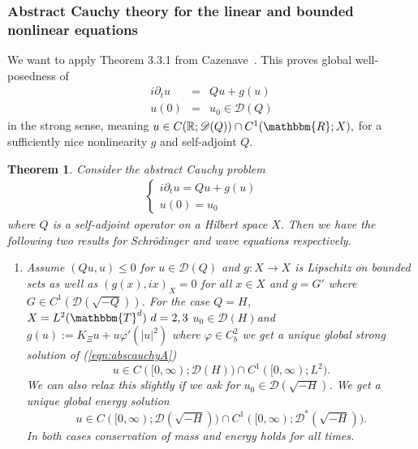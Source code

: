 \documentclass[11pt, oneside]{article}   	%
\newcommand{\assign}{:=}
\newenvironment{enumeratenumeric}{\begin{enumerate}[1.] }{\end{enumerate}}
\newtheorem{theorem}{Theorem}[section]
\begin{document}
		\subsubsection{Abstract Cauchy theory for the linear and bounded nonlinear
			equations}\label{sec:abslinear}
		We want to apply Theorem 3.3.1 from Cazenave~\cite{cazenave2003semilinear}. This proves global well-posedness of
		\begin{eqnarray*}
			i \partial_t u & = & Q u + g (u)\\
			u (0) & = & u_0 \in \mathscr{D} (Q)
		\end{eqnarray*}
		in the strong sense, meaning $u \in C (\mathbb{R}; \mathscr{D} (Q)) \cap C^1
		(\mathbbm{R}; X),$ for a sufficiently nice nonlinearity $g$ and self-adjoint
		$Q.$
		\begin{theorem}
			\label{thm:abscauchy}Consider the abstract Cauchy problem
			\begin{eqnarray}
			\left\{ \begin{array}{l}
			i \partial_t u = Q u + g (u)\\
			u (0) = u_0
			\end{array} \right. &  &  \label{eqn:abscauchyA}
			\end{eqnarray}
			where $Q$ is a self-adjoint operator on a Hilbert space $X.$ Then we have the
			following two results for Schr\"odinger and wave equations  respectively.
			\begin{enumeratenumeric}
				\item  Assume $(Q u, u) \le 0$ for $u \in \mathscr{D} (Q)$ and $g :
				X \rightarrow X$ is Lipschitz on bounded sets as well as $(g (x), i x)_X =
				0$ for all $x \in X$ and $g = G'$ where $G \in C^1 ( \mathscr{D}
				( \sqrt{- Q} ) )$. For the case $Q = H$, $X = L^2 (\mathbbm{T}^d) \ d = 2, 3$ $u_0
				\in \mathscr{D} (H)$and $g (u) \assign K_{\Xi} u + u \varphi' (| u |^2)$
				where $\varphi \in C_b^2$ we get a unique global strong solution of
				(\ref{eqn:abscauchyA})
				\[ u \in C ([0, \infty) ; \mathscr{D} (H)) \cap C^1 ([0, \infty) ; L^2) .
				\]
				We can also relax this slightly if we ask for $u_0 \in \mathscr{D} (
				\sqrt{- H} )$.  We get a unique global energy solution
				\[ u \in C ( [0, \infty) ; \mathscr{D} ( \sqrt{- H} )
				) \cap C^1 ( [0, \infty) ; \mathscr{D}^{\ast} ( \sqrt{-
					H} ) ) . \]
				In both cases conservation of mass and energy holds for all times.
				

\end{enumeratenumeric}
\end{theorem}
\end{document}
